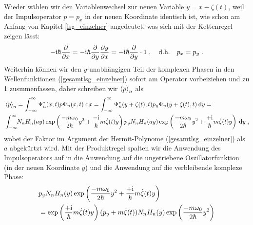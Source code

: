     Wieder wählen wir den Variablenwechsel zur neuen Variable $y=x-\zeta(t)$, weil der Impulsoperator $p=p_x$ in der neuen Koordinate identisch ist, wie schon am Anfang von Kapitel \ref{lsg_einzelner} angedeutet, was sich mit der Kettenregel zeigen lässt:
    \begin{equation}
      -\text i\hbar \frac{\partial}{\partial x} = -\text i\hbar \frac{\partial}{\partial y}\frac{\partial y}{\partial x} = -\text i\hbar \frac{\partial}{\partial y} \cdot 1 \; , \quad \text{d.h.} \quad p_x = p_y \; .
    \end{equation}
    Weiterhin können wir den $y$-unabhängigen Teil der komplexen Phasen in den Wellenfunktionen (\ref{gesamtlsg_einzelner}) sofort am Operator vorbeiziehen und zu 1 zusmmenfassen, daher schreiben wir $\braket{p}_n$ als
    \begin{align}
      &\braket{p}_n = \int_{-\infty}^{\infty} \Psi^*_n(x,t) p \Psi_n(x,t) \; \text dx
      = \int_{-\infty}^{\infty} \Psi^*_n(y+\zeta(t),t) p_y \Psi_n(y+\zeta(t),t) \: \text dy= \notag\\
      &\int_{-\infty}^{\infty} \!\! N_nH_n(ay)\exp\left(\frac{-m\omega_0}{2\hbar}y^2+\frac{-\text i}{\hbar}m\dot{\zeta}(t)y\right) p_y N_nH_n(ay)\exp\left(\frac{-m\omega_0}{2\hbar}y^2+\frac{+\text i}{\hbar}m\dot{\zeta}(t)y\right) \: \text dy \; ,
      \label{spaste}
    \end{align}
    wobei der Faktor im Argument der Hermit-Polynome (\ref{gesamtlsg_einzelner}) als $a$ abgekürtzt wird.
    Mit der Produktregel spalten wir die Anwendung des Impulsoperators auf in die Anwendung auf die ungetriebene Oszillatorfunktion (in der neuen Koordinate $y$) und die Anwendung auf die verbleibende komplexe Phase:
    \begin{align}
      &p_y N_nH_n(y)\exp\left(\frac{-m\omega_0}{2\hbar}y^2+\frac{+\text i}{\hbar}m\dot{\zeta}(t)y\right)  \notag\\
      &= \exp\left(\frac{+\text i}{\hbar}m\dot{\zeta}(t)y\right) (p_y+m\dot \zeta(t))N_nH_n(y)\exp\left(\frac{-m\omega_0}{2\hbar}y^2\right)
      \label{spaste2}
    \end{align}
